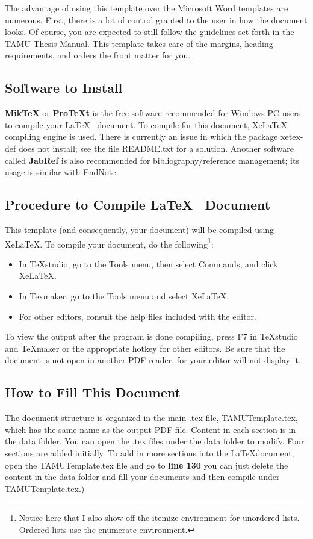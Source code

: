 The advantage of using this template over the Microsoft Word templates are numerous. First, there is a lot of control granted to the user in how the document looks. Of course, you are expected to still follow the guidelines set forth in the TAMU Thesis Manual. This template takes care of the margins, heading requirements, and orders the front matter for you.


\subsection*{Software to Install}

\textbf{MikTeX} or \textbf{ProTeXt} is the free software recommended for Windows PC users to
compile your \LaTeX ~ document. To compile for this document, XeLaTeX compiling engine
is used. There is currently an issue in which the package xetex-def does not install; see the file README.txt for a solution. Another software called \textbf{JabRef} is also recommended for bibliography/reference management; its usage is similar with EndNote.

\subsection*{Procedure to Compile \LaTeX ~ Document}

This template (and consequently, your document) will be compiled using XeLaTeX. To compile your document, do the following\footnote{Notice here that I also show off the itemize environment for unordered lists. Ordered lists use the enumerate environment.}:

\begin{itemize}
	\item In TeXstudio, go to the Tools menu, then select Commands, and click XeLaTeX.
	
	\item In Texmaker, go to the Tools menu and select XeLaTeX.
	
	\item For other editors, consult the help files included with the editor.
\end{itemize}

To view the output after the program is done compiling, press F7 in TeXstudio and TeXmaker or the appropriate hotkey for other editors. Be sure that the document is not open in another PDF reader, for your editor will not display it.

\subsection{How to Fill This Document}
The document structure is organized in the main .tex file, TAMUTemplate.tex,
which has the same name as the output PDF file. Content in each section is in the data folder. You can open the .tex files under the data folder to modify. Four sections
are added initially. To add in more sections into the \LaTeX document, open the
TAMUTemplate.tex file and go to \textbf{line 130} you can just delete the content in the data folder and fill your documents and then compile under TAMUTemplate.tex.)


